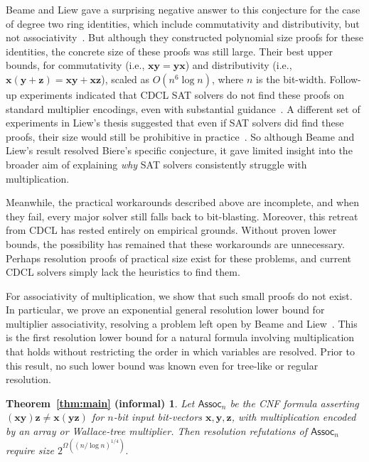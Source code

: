 \documentclass[11pt]{article}
\newtheorem*{informalmain}{Theorem~\ref{thm:main} (informal)}
\theoremstyle{definition}
\theoremstyle{remark}
\newcommand{\Assoc}{\mathsf{Assoc}}
\newcommand{\vv}[1]{\mathbf{#1}}
\begin{document}
Beame and Liew gave a surprising negative answer to this conjecture for the case of degree two ring identities, which include commutativity and distributivity, but not associativity~\cite{beame-liew}. But although they constructed polynomial size proofs for these identities, the concrete size of these proofs was still large. Their best upper bounds, for commutativity (i.e., $\vv{x}\vv{y}=\vv{y}\vv{x}$) and distributivity (i.e., $\vv{x}(\vv{y}+\vv{z})=\vv{x}\vv{y} + \vv{x}\vv{z}$), scaled as $O(n^6 \log n)$, where $n$ is the bit-width. Follow-up experiments indicated that CDCL SAT solvers do not find these proofs on standard multiplier encodings, even with substantial guidance~\cite{liew-thesis,bbkmt26}. A different set of experiments in Liew's thesis suggested that even if SAT solvers did find these proofs, their size would still be prohibitive in practice~\cite{liew-thesis}. So although Beame and Liew's result resolved Biere's specific conjecture, it gave limited insight into the broader aim of explaining \emph{why} SAT solvers consistently struggle with multiplication.

Meanwhile, the practical workarounds described above are incomplete, and when they fail, every major solver still falls back to bit-blasting. Moreover, this retreat from CDCL has rested entirely on empirical grounds. Without proven lower bounds, the possibility has remained that these workarounds are unnecessary. Perhaps resolution proofs of practical size exist for these problems, and current CDCL solvers simply lack the heuristics to find them.

For associativity of multiplication, we show that such small proofs do not exist. In particular, we prove an exponential general resolution lower bound for multiplier associativity, resolving a problem left open by Beame and Liew~\cite{beame-liew}. This is the first resolution lower bound for a natural formula involving multiplication that holds without restricting the order in which variables are resolved. Prior to this result, no such lower bound was known even for tree-like or regular resolution.

\begin{informalmain}
Let $\Assoc_n$ be the CNF formula asserting $(\vv{x}\vv{y})\vv{z}\ne\vv{x}(\vv{y}\vv{z})$ for $n$-bit input bit-vectors $\vv{x},\vv{y},\vv{z}$, with multiplication encoded by an array or Wallace-tree multiplier. Then resolution refutations of $\Assoc_n$ require size
$
2^{\Omega((n/\log n)^{1/4})}.
$
\end{informalmain}
\end{document}
